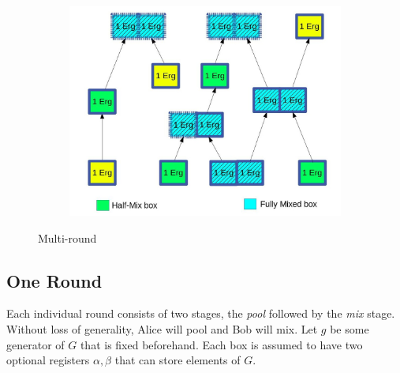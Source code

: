 \documentclass[11pt]{article}
\begin{document}
\begin{figure}[h]
	\centering
	\begin{subfigure}{.6\textwidth}
		\centering
		\includegraphics[width=\linewidth]{ErgoMix}
	\end{subfigure}
	\caption{Multi-round \algname}
\label{fig:mixname}
\end{figure}


\subsection{One \algname Round}
Each individual \algname round consists of two stages, the {\em pool} followed by the {\em mix} stage. 
Without loss of generality, Alice will pool and Bob will mix. 
Let $g$ be some generator of $G$ that is fixed beforehand. Each box is assumed to have two optional registers $\alpha, \beta$ that can store elements of $G$.
\end{document}
